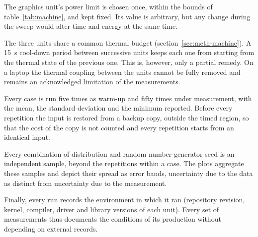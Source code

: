 The graphics unit's power limit is chosen once, within the bounds of
table~\ref{tab:machine}, and kept fixed. Its value is arbitrary, but any change
during the sweep would alter time and energy at the same time.

The three units share a common thermal budget (section~\ref{sec:meth-machine}).
A \qty{15}{\second} cool-down period between successive units keeps each one
from starting from the thermal state of the previous one. This is, however,
only a partial remedy. On a laptop the thermal coupling between the units
cannot be fully removed and remains an acknowledged limitation of the
measurements.

Every case is run five times as warm-up and fifty times under measurement, with
the mean, the standard deviation and the minimum reported. Before every
repetition the input is restored from a backup copy, outside the timed region,
so that the cost of the copy is not counted and every repetition starts from an
identical input.

Every combination of distribution and random-number-generator seed is an
independent sample, beyond the repetitions within a case. The plots aggregate
these samples and depict their spread as error bands, uncertainty due to the
data as distinct from uncertainty due to the measurement.

Finally, every run records the environment in which it ran (repository
revision, kernel, compiler, driver and library versions of each unit). Every
set of measurements thus documents the conditions of its production without
depending on external records.
